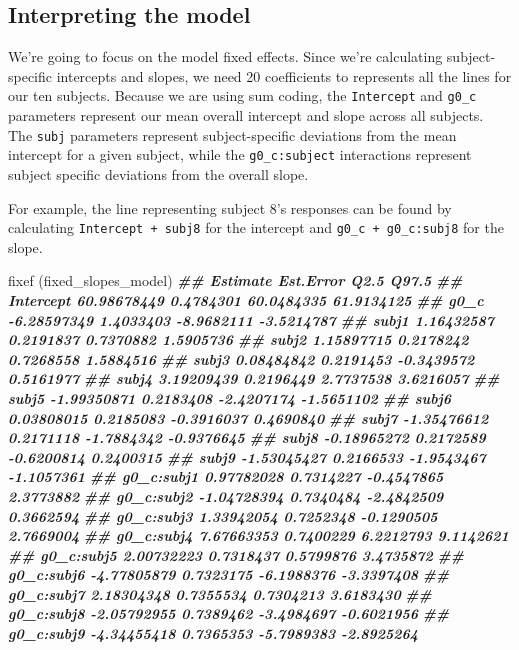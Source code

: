 \documentclass[
]{book}
\newenvironment{Shaded}{\begin{snugshade}}{\end{snugshade}}
\newcommand{\DocumentationTok}[1]{\textcolor[rgb]{0.56,0.35,0.01}{\textbf{\textit{#1}}}}
\newcommand{\FunctionTok}[1]{\textcolor[rgb]{0.00,0.00,0.00}{#1}}
\newcommand{\NormalTok}[1]{#1}
\begin{document}
\hypertarget{interpreting-the-model-4}{%
\subsection{Interpreting the model}\label{interpreting-the-model-4}}

We're going to focus on the model fixed effects. Since we're calculating subject-specific intercepts and slopes, we need 20 coefficients to represents all the lines for our ten subjects. Because we are using sum coding, the \texttt{Intercept} and \texttt{g0\_c} parameters represent our mean overall intercept and slope across all subjects. The \texttt{subj} parameters represent subject-specific deviations from the mean intercept for a given subject, while the \texttt{g0\_c:subject} interactions represent subject specific deviations from the overall slope.

For example, the line representing subject 8's responses can be found by calculating \texttt{Intercept\ +\ subj8} for the intercept and \texttt{g0\_c\ +\ g0\_c:subj8} for the slope.

\begin{Shaded}
\begin{Highlighting}[]
\FunctionTok{fixef}\NormalTok{ (fixed\_slopes\_model)}
\DocumentationTok{\#\#               Estimate Est.Error       Q2.5      Q97.5}
\DocumentationTok{\#\# Intercept  60.98678449 0.4784301 60.0484335 61.9134125}
\DocumentationTok{\#\# g0\_c       {-}6.28597349 1.4033403 {-}8.9682111 {-}3.5214787}
\DocumentationTok{\#\# subj1       1.16432587 0.2191837  0.7370882  1.5905736}
\DocumentationTok{\#\# subj2       1.15897715 0.2178242  0.7268558  1.5884516}
\DocumentationTok{\#\# subj3       0.08484842 0.2191453 {-}0.3439572  0.5161977}
\DocumentationTok{\#\# subj4       3.19209439 0.2196449  2.7737538  3.6216057}
\DocumentationTok{\#\# subj5      {-}1.99350871 0.2183408 {-}2.4207174 {-}1.5651102}
\DocumentationTok{\#\# subj6       0.03808015 0.2185083 {-}0.3916037  0.4690840}
\DocumentationTok{\#\# subj7      {-}1.35476612 0.2171118 {-}1.7884342 {-}0.9376645}
\DocumentationTok{\#\# subj8      {-}0.18965272 0.2172589 {-}0.6200814  0.2400315}
\DocumentationTok{\#\# subj9      {-}1.53045427 0.2166533 {-}1.9543467 {-}1.1057361}
\DocumentationTok{\#\# g0\_c:subj1  0.97782028 0.7314227 {-}0.4547865  2.3773882}
\DocumentationTok{\#\# g0\_c:subj2 {-}1.04728394 0.7340484 {-}2.4842509  0.3662594}
\DocumentationTok{\#\# g0\_c:subj3  1.33942054 0.7252348 {-}0.1290505  2.7669004}
\DocumentationTok{\#\# g0\_c:subj4  7.67663353 0.7400229  6.2212793  9.1142621}
\DocumentationTok{\#\# g0\_c:subj5  2.00732223 0.7318437  0.5799876  3.4735872}
\DocumentationTok{\#\# g0\_c:subj6 {-}4.77805879 0.7323175 {-}6.1988376 {-}3.3397408}
\DocumentationTok{\#\# g0\_c:subj7  2.18304348 0.7355534  0.7304213  3.6183430}
\DocumentationTok{\#\# g0\_c:subj8 {-}2.05792955 0.7389462 {-}3.4984697 {-}0.6021956}
\DocumentationTok{\#\# g0\_c:subj9 {-}4.34455418 0.7365353 {-}5.7989383 {-}2.8925264}
\end{Highlighting}
\end{Shaded}
\end{document}
